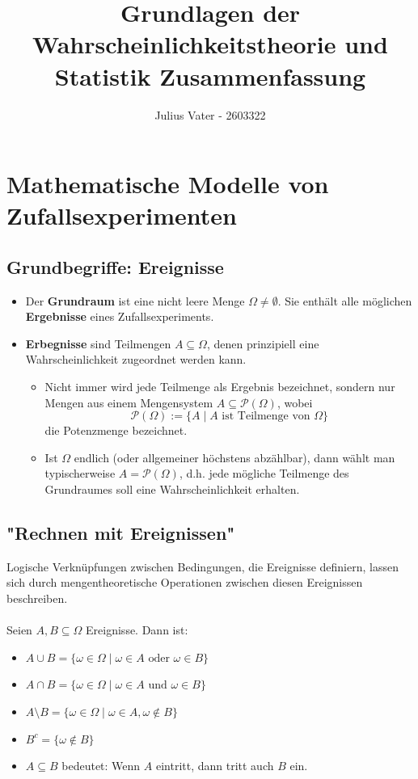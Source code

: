 \documentclass{kit}
\author{Julius Vater - 2603322}
\title{Grundlagen der Wahrscheinlichkeitstheorie und Statistik Zusammenfassung}
\begin{document}
\maketitle
\tableofcontents
\pagebreak
\section{Mathematische Modelle von Zufallsexperimenten}
  \subsection{Grundbegriffe: Ereignisse}
    \begin{itemize}
      \item Der \textbf{Grundraum} ist eine nicht leere Menge $\Omega\neq\emptyset$. Sie enthält alle möglichen 
        \textbf{Ergebnisse} eines Zufallsexperiments.
      \item \textbf{Erbegnisse} sind Teilmengen $A\subseteq\Omega$, denen prinzipiell eine Wahrscheinlichkeit zugeordnet
        werden kann.
        \begin{itemize}
          \item Nicht immer wird jede Teilmenge als Ergebnis bezeichnet, sondern nur Mengen aus einem Mengensystem
            $A\subseteq\mathscr{P}(\Omega)$, wobei
            $$\mathscr{P}(\Omega):=\{A\mid A\text{ ist Teilmenge von }\Omega\}$$
            die Potenzmenge bezeichnet.
          \item Ist $\Omega$ endlich (oder allgemeiner höchstens abzählbar), dann wählt man typischerweise 
            $A=\mathscr{P}(\Omega)$, d.h. jede mögliche Teilmenge des Grundraumes soll eine Wahrscheinlichkeit erhalten.
        \end{itemize}
    \end{itemize}
  \subsection{"Rechnen mit Ereignissen"}
    Logische Verknüpfungen zwischen Bedingungen, die Ereignisse definiern, lassen sich durch mengentheoretische 
    Operationen zwischen diesen Ereignissen beschreiben.\\\\
    Seien $A,B\subseteq\Omega$ Ereignisse. Dann ist:
    \begin{itemize}
      \item $A\cup B=\{\omega\in\Omega\mid\omega\in A\text{ oder }\omega\in B\}$
      \item $A\cap B=\{\omega\in\Omega\mid\omega\in A\text{ und }\omega\in B\}$
      \item $A\setminus B=\{\omega\in\Omega\mid\omega\in A,\omega\notin B\}$
      \item $B^c=\{\omega\notin B\}$
      \item $A\subseteq B$ bedeutet: Wenn $A$ eintritt, dann tritt auch $B$ ein.
    \end{itemize}
\end{document}
